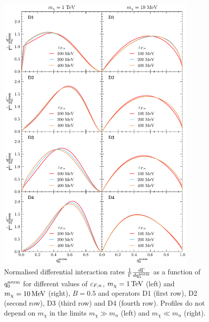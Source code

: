 \begin{figure}[t!bp]
    \centering
    \includegraphics[width = 0.87\textwidth]{capture_1/norm_diff_intrate.pdf}    
    \caption[Normalised differential interaction rates $\frac{1}{\Gamma}\frac{d\Gamma}{d\qonorm}$ as a function of $\qonorm$.]{Normalised differential interaction rates $\frac{1}{\Gamma}\frac{d\Gamma}{d\qonorm}$ as a function of $\qonorm$ for different values of $\varepsilon_{F,n}$, $m_\chi=1{\rm \,TeV}$ (left) and $m_\chi=10{\rm \,MeV}$ (right), $B=0.5$ and  operators D1 (first row), D2 (second row), D3 (third row) and D4 (fourth row). Profiles do not depend on $m_\chi$ in the limits $m_\chi\gg m_n$ (left) and $m_\chi\ll m_n$ (right).  }
    \label{ch3:fig:diffintratesd14}
\end{figure}


